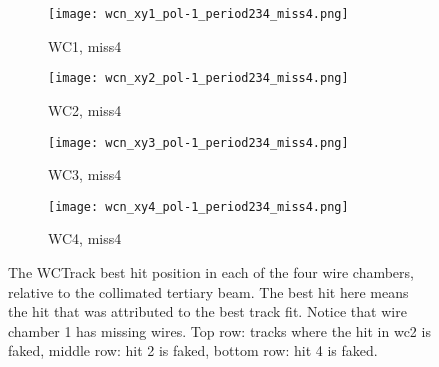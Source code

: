 \begin{figure}[h]
                     \begin{subfigure}[b]{0.23\textwidth}
            \centering
            \texttt{[image: wcn\_xy1\_pol-1\_period234\_miss4.png]}
            \caption{WC1, miss4}
            \label{fig_wc1}
            \end{subfigure}
            \hfill             
             \begin{subfigure}[b]{0.23\textwidth}
            \centering
            \texttt{[image: wcn\_xy2\_pol-1\_period234\_miss4.png]}
            \caption{WC2, miss4}
            \label{fig_wc2}
            \end{subfigure}
            \hfill 
              \begin{subfigure}[b]{0.23\textwidth}
            \centering
            \texttt{[image: wcn\_xy3\_pol-1\_period234\_miss4.png]}
            \caption{WC3, miss4}
            \label{fig_wc3}
            \end{subfigure}
            \hfill    
             \begin{subfigure}[b]{0.23\textwidth}
            \centering
            \texttt{[image: wcn\_xy4\_pol-1\_period234\_miss4.png]}
            \caption{WC4, miss4}
            \label{fig_wc4}
            \end{subfigure}
            \hfill

   \caption[short]{The WCTrack best hit position in each of the four wire chambers, relative to the collimated tertiary beam. The best hit here means the hit that was attributed to the best track fit. Notice that wire chamber 1 has missing wires. Top row: tracks where the hit in wc2 is faked, middle row: hit 2 is faked, bottom row: hit 4 is faked.}
   \label{fig_xyhits}
  \end{figure}
  
  
  
  
  
